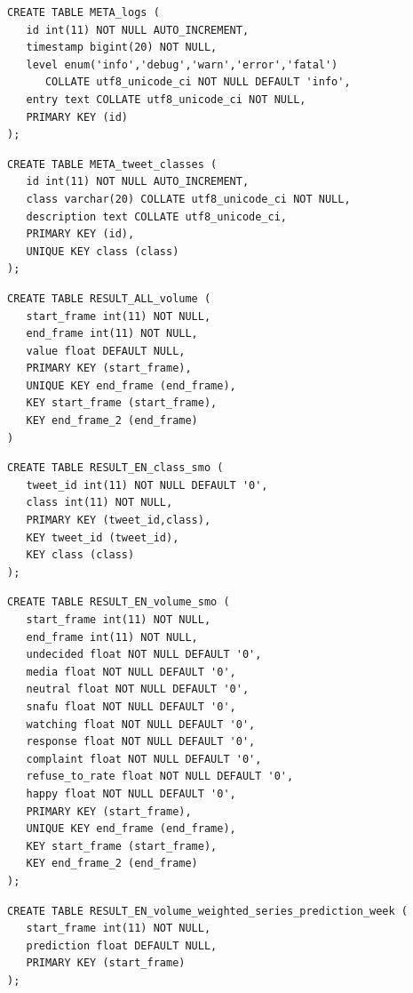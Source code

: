 \documentclass[12pt]{ucthesis}
\begin{document}
\begin{lstlisting}
CREATE TABLE META_logs (
   id int(11) NOT NULL AUTO_INCREMENT,
   timestamp bigint(20) NOT NULL,
   level enum('info','debug','warn','error','fatal')
      COLLATE utf8_unicode_ci NOT NULL DEFAULT 'info',
   entry text COLLATE utf8_unicode_ci NOT NULL,
   PRIMARY KEY (id)
);
\end{lstlisting}

\begin{lstlisting}
CREATE TABLE META_tweet_classes (
   id int(11) NOT NULL AUTO_INCREMENT,
   class varchar(20) COLLATE utf8_unicode_ci NOT NULL,
   description text COLLATE utf8_unicode_ci,
   PRIMARY KEY (id),
   UNIQUE KEY class (class)
);
\end{lstlisting}

\begin{lstlisting}
CREATE TABLE RESULT_ALL_volume (
   start_frame int(11) NOT NULL,
   end_frame int(11) NOT NULL,
   value float DEFAULT NULL,
   PRIMARY KEY (start_frame),
   UNIQUE KEY end_frame (end_frame),
   KEY start_frame (start_frame),
   KEY end_frame_2 (end_frame)
)
\end{lstlisting}

\begin{lstlisting}
CREATE TABLE RESULT_EN_class_smo (
   tweet_id int(11) NOT NULL DEFAULT '0',
   class int(11) NOT NULL,
   PRIMARY KEY (tweet_id,class),
   KEY tweet_id (tweet_id),
   KEY class (class)
);
\end{lstlisting}

\begin{lstlisting}
CREATE TABLE RESULT_EN_volume_smo (
   start_frame int(11) NOT NULL,
   end_frame int(11) NOT NULL,
   undecided float NOT NULL DEFAULT '0',
   media float NOT NULL DEFAULT '0',
   neutral float NOT NULL DEFAULT '0',
   snafu float NOT NULL DEFAULT '0',
   watching float NOT NULL DEFAULT '0',
   response float NOT NULL DEFAULT '0',
   complaint float NOT NULL DEFAULT '0',
   refuse_to_rate float NOT NULL DEFAULT '0',
   happy float NOT NULL DEFAULT '0',
   PRIMARY KEY (start_frame),
   UNIQUE KEY end_frame (end_frame),
   KEY start_frame (start_frame),
   KEY end_frame_2 (end_frame)
);
\end{lstlisting}

\begin{lstlisting}
CREATE TABLE RESULT_EN_volume_weighted_series_prediction_week (
   start_frame int(11) NOT NULL,
   prediction float DEFAULT NULL,
   PRIMARY KEY (start_frame)
);
\end{lstlisting}
\end{document}
